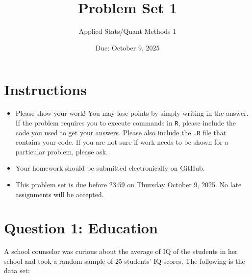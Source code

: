 \documentclass[12pt,letterpaper]{article}
\title{Problem Set 1}
\date{Due: October 9, 2025}
\author{Applied Stats/Quant Methods 1}
\begin{document}
	\maketitle
	
	\section*{Instructions}
	\begin{itemize}
	\item Please show your work! You may lose points by simply writing in the answer. If the problem requires you to execute commands in \texttt{R}, please include the code you used to get your answers. Please also include the \texttt{.R} file that contains your code. If you are not sure if work needs to be shown for a particular problem, please ask.
\item Your homework should be submitted electronically on GitHub.
\item This problem set is due before 23:59 on Thursday October 9, 2025. No late assignments will be accepted.
	\end{itemize}
	
	\vspace{1cm}
	\section*{Question 1: Education}

A school counselor was curious about the average of IQ of the students in her school and took a random sample of 25 students' IQ scores. The following is the data set:\\

  

\vspace{1cm}
\end{document}
